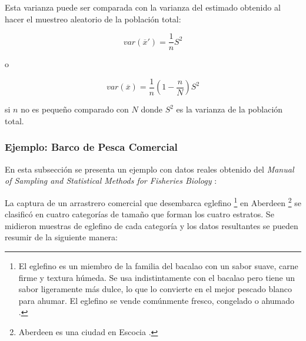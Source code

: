 \documentclass[conference]{IEEEtran}
\begin{document}
Esta varianza puede ser comparada con la varianza del estimado obtenido al hacer el muestreo aleatorio de la población total:

$$
var(\overline{x}') = \frac{1}{n}S^2
$$

o

$$
var(\overline{x}) = \frac{1}{n}(1 - \frac{n}{N})S^2
$$

si $n$ no es pequeño comparado con $N$ donde $S^2$ es la varianza de la población total.

\subsubsection{Ejemplo: Barco de Pesca Comercial}

En esta subsección se presenta un ejemplo con datos reales obtenido del \textit{Manual of Sampling and Statistical Methods for Fisheries Biology} \cite{gulland-1966}:

\bigbreak

La captura de un arrastrero comercial que desembarca eglefino \footnote{El eglefino es un miembro de la familia del bacalao con un sabor suave, carne firme y textura húmeda. Se usa indistintamente con el bacalao pero tiene un sabor ligeramente más dulce, lo que lo convierte en el mejor pescado blanco para ahumar. El eglefino se vende comúnmente fresco, congelado o ahumado \cite{sustainable-fishing-msc-marine-stewardship-council-2021}.} en Aberdeen \footnote{Aberdeen es una ciudad en Escocia \cite{wikipedia-aberdeen-2021}.} se clasificó en cuatro categorías de tamaño que forman los cuatro estratos. Se midieron muestras de eglefino de cada categoría y los datos resultantes se pueden resumir de la siguiente manera:

\bigbreak

\end{document}
